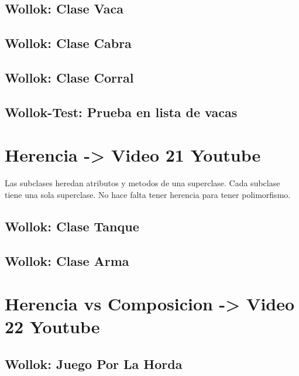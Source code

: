 \documentclass[11pt,a4paper]{article}
\begin{document}
\subsection{Wollok: Clase Vaca}


\subsection{Wollok: Clase Cabra}


\subsection{Wollok: Clase Corral}


\subsection{Wollok-Test: Prueba en lista de vacas}

\newpage
\section{Herencia -> Video 21 Youtube}
Las subclases heredan atributos y metodos de una superclase. Cada subclase tiene una sola superclase. No hace falta tener herencia para tener polimorfismo.

\subsection{Wollok: Clase Tanque}


\subsection{Wollok: Clase Arma}


\newpage
\section{Herencia vs Composicion -> Video 22 Youtube}

\subsection{Wollok: Juego Por La Horda}


\newpage
\appendix


%
%
\end{document}

